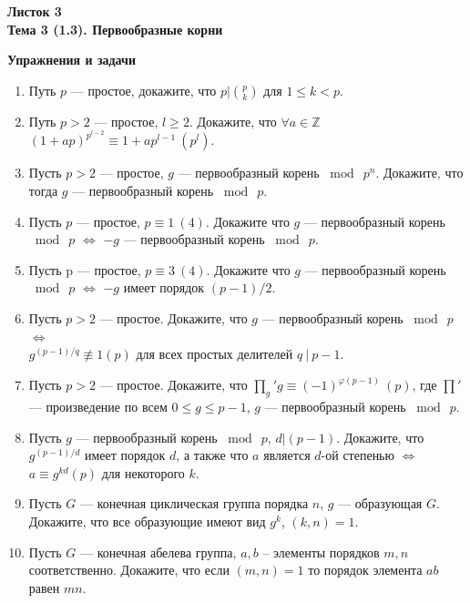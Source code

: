 \documentclass[a4paper, 11pt]{article}
\begin{document}
\begin{center} \Large \bf Листок 3\\ Тема 3 (1.3). Первообразные корни \end{center}

\noindent\textbf{Упражнения и задачи}

\begin{enumerate}[topsep=0pt]
    \item Путь $p$ --- простое, докажите, что $p|\binom{p}{k}$ для $1 \leqslant k < p$.
    \item Путь $p>2$ --- простое, $l\geqslant 2$. Докажите, что $\forall a \in \mathbb{Z}$ $(1+ap)^{p^{l-2}} \equiv 1+ap^{l-1}\ (p^l)$.
    \item Пусть $p>2$ --- простое, $g$ --- первообразный корень $\bmod\ p^n$. Докажите, что тогда $g$ --- первообразный корень $\bmod\ p$. %
    \item Пусть $p$ --- простое, $p \equiv 1\ (4)$. Докажите что $g$ --- первообразный корень $\bmod\ p$ $\Leftrightarrow$ $-g$ --- первообразный корень $\bmod\ p$. %
    \item Пусть p --- простое, $p \equiv 3\ (4)$. Докажите что $g$ --- первообразный корень $\bmod\ p$ $\Leftrightarrow$ $-g$ имеет порядок $(p-1)/2$. %
    \item Пусть $p>2$ --- простое. Докажите, что $g$ --- первообразный корень $\bmod\ p$ $\Leftrightarrow$\\ $g^{(p-1)/q}\not\equiv 1 (p)$ для всех простых делителей $q\ |\ p-1$. %
    \item Пусть $p>2$ --- простое. Докажите, что ${\prod\limits_{g}}'g \equiv (-1)^{\varphi(p-1)}\ (p)$, где $\prod'$ --- произведение по всем $0\leqslant g \leqslant p-1$, $g$ --- первообразный корень $\bmod\ p$. %
    \item Пусть $g$ --- первообразный корень $\bmod\ p$, $d|(p-1)$. Докажите, что $g^{(p-1)/d}$ имеет порядок $d$, а также что $a$ является $d$-ой степенью $\Leftrightarrow$ $a \equiv g^{kd} (p)$ для некоторого $k$. %
    \item Пусть $G$ --- конечная циклическая группа порядка $n$, $g$ --- образующая $G$. Докажите, что все образующие имеют вид $g^k$, $(k,n)=1$. %
    \item Пусть $G$ --- конечная абелева группа, $a,b$ – элементы порядков $m,n$ соответственно. Докажите, что если $(m,n)=1$ то порядок элемента $ab$ равен $mn$. %

\end{enumerate}
\end{document}
